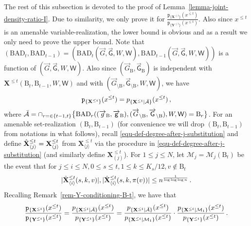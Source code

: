 \documentclass[11pt]{article}
\numberwithin{equation}{section}
\begin{document}
The rest of this subsection is devoted to the proof of Lemma~\ref{lemma-joint-density-ratio-I}. Due to similarity, we only prove it for $\frac{ \mathtt{p}_{\{ \mathbf{X}^{\leq t} \}} (x^{\leq t}) }{ \mathtt{p}_{ \{ \mathbf{Y}^{\leq t} \} } (x^{\leq t}) }$. Also since $x^{\leq t}$ is an amenable variable-realization, the lower bound is obvious and as a result we only need to prove the upper bound. Note that $(\mathrm{BAD}_{t}, \mathrm{BAD}_{t-1}) = (\mathrm{BAD}_{t}( \overrightarrow{G}, \overrightarrow{\mathsf{G}}, W,\mathsf{W} ), \mathrm{BAD}_{t-1}( \overrightarrow{G}, \overrightarrow{\mathsf{G}}, W, \mathsf{W} ))$ is a function of $(\overrightarrow{G}, \overrightarrow{\mathsf{G}}, W, \mathsf{W})$. Also since $( \overrightarrow{G}_{\mathrm{B}}, \overrightarrow{\mathsf{G}}_{\mathrm{B}} )$  is independent with $\mathbf{X}^{\leq t}(\mathrm{B}_t, \mathrm{B}_{t-1}, W,\mathsf{W})$ and with $( \overrightarrow{G}_{\setminus \mathrm{B}}, \overrightarrow{\mathsf{G}}_{\setminus \mathrm{B}}, W,\mathsf{W})$, we have 
\begin{align*}
    \mathtt{p}_{ \{ \mathbf{X}^{\leq t} \} } (x^{\leq t}) = p_{ \{ \mathbf{X}^{\leq t} | \Bar{\mathcal{A}} \} } (x^{\leq t}) \,,
\end{align*}
where $\Bar{\mathcal{A}} = \cap_{r=\in \{t-1, t\}}\big\{ \mathrm{BAD}_{r}( ( \overrightarrow{g}_{\mathrm{B}}, \overrightarrow{\mathsf{g}}_{\mathrm{B}} ), ( \overrightarrow{G}_{\setminus \mathrm{B}}, \overrightarrow{\mathsf{G}}_{\setminus \mathrm{B}} ), W,\mathsf{W} ) = \mathrm{B}_{r} \big\}$.
For an amenable set-realization $(\mathrm{B}_t, \mathrm{B}_{t-1})$ (for convenience we will drop $(\mathrm{B}_t, \mathrm{B}_{t-1})$ from notations in what follows), recall  \eqref{equ-def-degree-after-j-substitution} and define $\Hat{\mathbf{X}}^{\leq t}_{ \langle j \rangle } = \mathbf{X}^{\leq t}_{ \langle j \rangle }$ from  $\mathbf{X}^{\leq t}_{ \langle j \rangle }$ via the procedure in \eqref{equ-def-degree-after-j-substitution} (and similarly define $\mathbf{X}^{\leq t}_{ ( j ) }$). For $1\leq j\leq N$, let $\mathcal M_j = \mathcal M_j(\mathrm{B}_t)$ be the event that for $j \leq i \leq N, 0\leq s\leq t, 1\leq k \leq K_s/12, v \not \in  \mathrm{B}_{t}$
\begin{align}
    | \Hat{\mathbf{X}}^{\leq t}_{ \langle i \rangle} (s,k,v) | , | \Hat{\mathbf{X}}^{\leq t}_{ \langle i \rangle} (s,k,\pi(v)) | \leq n^{ \frac{1}{\log \log \log n}} \,.  \label{equ-def-truncate-event-mathcal-M}
\end{align}
Recalling Remark~\ref{rem-Y-conditioning-B-t}, we have that
\begin{align*}
    \frac{ \mathtt{p}_{ \{ \mathbf{X}^{\leq t} \} } (x^{\leq t}) }{  \mathtt{p}_{ \{ \mathbf{Y}^{\leq t} \} } (x^{\leq t})  } = \frac{ p_{ \{ \mathbf{X}^{\leq t} | \Bar{\mathcal{A}} \} } (x^{\leq t}) }{ p_{ \{ \mathbf{Y}^{\leq t} \} } (x^{\leq t}) } =
    \frac{ {p}_{ \{ \mathbf{X}^{\leq t} | \Bar{\mathcal{A}} \} } (x^{\leq t}) }{  {p}_{ \{ \mathbf{X}^{\leq t} | \mathcal{M}_{1} \} } (x^{\leq t}) } \cdot \frac{ {p}_{ \{ \mathbf{X}^{\leq t} | \mathcal{M}_1 \} } (x^{\leq t}) }{ {p}_{ \{ \mathbf{Y}^{\leq t} \} } (x^{\leq t}) } \,.
\end{align*}
\end{document}
